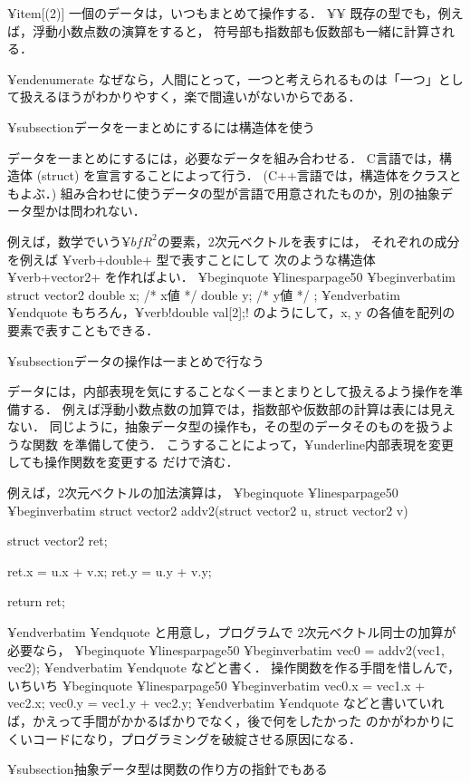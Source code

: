  ¥item[(2)] 一個のデータは，いつもまとめて操作する．	¥¥
既存の型でも，例えば，浮動小数点数の演算をすると，
符号部も指数部も仮数部も一緒に計算される．

¥end{enumerate}
なぜなら，人間にとって，一つと考えられるものは「一つ」として扱えるほうがわかりやすく，楽で間違いがないからである．

¥subsection{データを一まとめにするには構造体を使う}

データを一まとめにするには，必要なデータを組み合わせる．
C言語では，構造体 (struct) を宣言することによって行う．
(C++言語では，構造体をクラスともよぶ．)
組み合わせに使うデータの型が言語で用意されたものか，別の抽象データ型かは問われない．

例えば，数学でいう${¥bf R}^2$の要素，2次元ベクトルを表すには，
それぞれの成分を例えば ¥verb+double+ 型で表すことにして
次のような構造体 ¥verb+vector2+ を作ればよい．
¥begin{quote}
¥linesparpage{50}
¥begin{verbatim}
struct vector2 {
        double x;       /* x値 */
        double y;       /* y値 */
};
¥end{verbatim}
¥end{quote}
もちろん，¥verb!double val[2];! のようにして，x, y の各値を配列の要素で表すこともできる．


¥subsection{データの操作は一まとめで行なう}

データには，内部表現を気にすることなく一まとまりとして扱えるよう操作を準備する．
例えば浮動小数点数の加算では，指数部や仮数部の計算は表には見えない．
同じように，抽象データ型の操作も，その型のデータそのものを扱うような関数
を準備して使う．
こうすることによって，¥underline{内部表現を変更しても操作関数を変更する
だけで済む}．

例えば，2次元ベクトルの加法演算は，
¥begin{quote}
¥linesparpage{50}
¥begin{verbatim}
struct vector2 addv2(struct vector2 u, struct vector2 v)
{
        struct vector2 ret;

        ret.x = u.x + v.x;
        ret.y = u.y + v.y;

        return ret;
}
¥end{verbatim}
¥end{quote}
と用意し，プログラムで 2次元ベクトル同士の加算が必要なら，
¥begin{quote}
¥linesparpage{50}
¥begin{verbatim}
vec0 = addv2(vec1, vec2);
¥end{verbatim}
¥end{quote}
などと書く．
操作関数を作る手間を惜しんで，いちいち
¥begin{quote}
¥linesparpage{50}
¥begin{verbatim}
vec0.x = vec1.x + vec2.x;
vec0.y = vec1.y + vec2.y;
¥end{verbatim}
¥end{quote}
などと書いていれば，かえって手間がかかるばかりでなく，後で何をしたかった
のかがわかりにくいコードになり，プログラミングを破綻させる原因になる．

¥subsection{抽象データ型は関数の作り方の指針でもある}


